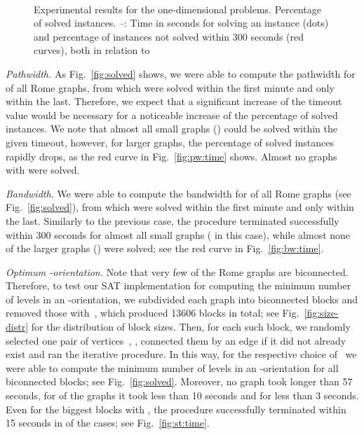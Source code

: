 \documentclass[runningheads]{llncs}
\begin{document}
\begin{figure}[t]
 \hfill
 \\
 \hfill
 \caption{\small
  Experimental results for the one-dimensional problems.
  \protect{} Percentage of solved instances.
  \protect{}--\protect{}: 
  Time in seconds for solving an instance (dots)
  and percentage of instances not solved within 300 seconds (red curves), 
  both in relation to~ 
}\label{fig:1d}
	\vspace{-2ex}
\end{figure}

\smallskip\noindent\textit{Pathwidth.}
As Fig.~\ref{fig:solved} shows,
we were able to compute the pathwidth for  of all Rome graphs,
from which  were solved within the first minute
and only  within the last.
Therefore, we expect that a significant increase of the timeout value
would be necessary for a noticeable increase 
of the percentage of solved instances.
We note that almost all small graphs ()
could be solved within the given timeout,
however, for larger graphs, the percentage of solved instances rapidly drops,
as the red curve in Fig.~\ref{fig:pw:time} shows.
Almost no graphs with  were solved.

\smallskip\noindent\textit{Bandwidth.}
We were able to compute the bandwidth for  of all Rome graphs
(see Fig.~\ref{fig:solved}),
from which  were solved within the first minute
and only  within the last.
Similarly to the previous case, the procedure 
terminated successfully within 300 seconds 
for almost all small graphs ( in this case), 
while almost none of the larger graphs () were solved;
see the red curve in Fig.~\ref{fig:bw:time}.

\smallskip\noindent\textit{Optimum -orientation.}
Note that very few of the Rome graphs are biconnected.
Therefore, to test our SAT implementation 
for computing the minimum number of levels in an -orientation,
we subdivided each graph into biconnected blocks 
and removed those with~,
which produced 13606 blocks in total;
see Fig.~\ref{fig:size-distr} for the distribution of block sizes.
Then, for each such block, we randomly selected 
one pair of vertices~, , connected them by an edge if
it did not already exist and ran the iterative procedure.
In this way, for the respective choice of~
we were able to compute the minimum number of levels 
in an -orientation for all biconnected blocks; 
see Fig.~\ref{fig:solved}.
Moreover, no graph took longer than 57 seconds,
for  of the graphs it took less than 10 seconds
and for  less than 3 seconds.
Even for the biggest blocks with ,
the procedure successfully terminated within 15 seconds 
in  of the cases; see Fig.~\ref{fig:st:time}.
\end{document}
